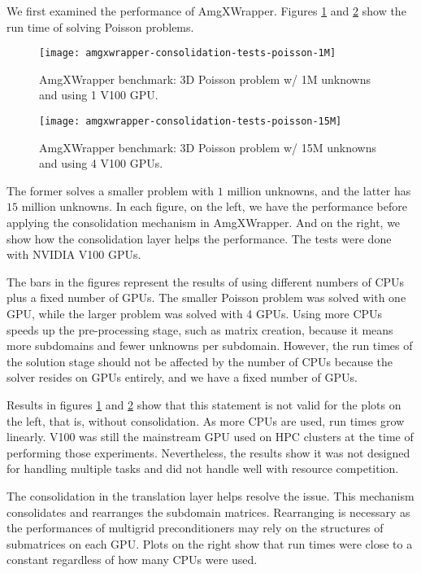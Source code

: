 
We first examined the performance of AmgXWrapper.
Figures \ref{fig:amgxwrapper-cons-1M} and \ref{fig:amgxwrapper-cons-15M} show the run time of solving Poisson problems.
\begin{figure}[hbt!]%
    \texttt{[image: amgxwrapper-consolidation-tests-poisson-1M]}%
    \caption{AmgXWrapper benchmark: 3D Poisson problem w/ 1M unknowns and using 1 V100 GPU.}\label{fig:amgxwrapper-cons-1M}%
\end{figure}
\begin{figure}[hbt!]%
    \texttt{[image: amgxwrapper-consolidation-tests-poisson-15M]}%
    \caption{AmgXWrapper benchmark: 3D Poisson problem w/ 15M unknowns and using 4 V100 GPUs.}\label{fig:amgxwrapper-cons-15M}%
\end{figure}
The former solves a smaller problem with $1$ million unknowns, and the latter has $15$ million unknowns.
In each figure, on the left, we have the performance before applying the consolidation mechanism in AmgXWrapper.
And on the right, we show how the consolidation layer helps the performance.
The tests were done with NVIDIA V100 GPUs.

The bars in the figures represent the results of using different numbers of CPUs plus a fixed number of GPUs.
The smaller Poisson problem was solved with one GPU, while the larger problem was solved with 4 GPUs.
Using more CPUs speeds up the pre-processing stage, such as matrix creation, because it means more subdomains and fewer unknowns per subdomain.
However, the run times of the solution stage should not be affected by the number of CPUs because the solver resides on GPUs entirely, and we have a fixed number of GPUs.

Results in figures \ref{fig:amgxwrapper-cons-1M} and \ref{fig:amgxwrapper-cons-15M} show that this statement is not valid for the plots on the left, that is, without consolidation. 
As more CPUs are used, run times grow linearly.
V100 was still the mainstream GPU used on HPC clusters at the time of performing those experiments.
Nevertheless, the results show it was not designed for handling multiple tasks and did not handle well with resource competition.

The consolidation in the translation layer helps resolve the issue.
This mechanism consolidates and rearranges the subdomain matrices.
Rearranging is necessary as the performances of multigrid preconditioners may rely on the structures of submatrices on each GPU.
Plots on the right show that run times were close to a constant regardless of how many CPUs were used.

